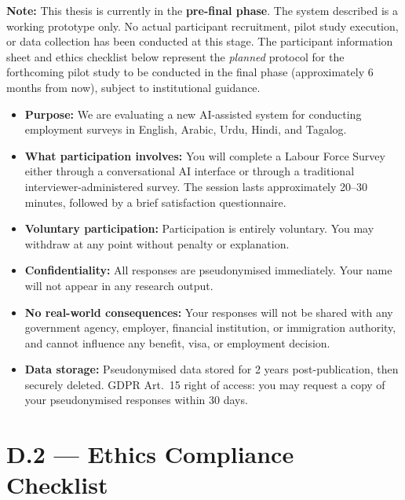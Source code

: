 \noindent\textbf{Note:}
This thesis is currently in the \textbf{pre-final phase}. The system described
is a working prototype only. No actual participant recruitment, pilot study
execution, or data collection has been conducted at this stage. The participant
information sheet and ethics checklist below represent the \textit{planned}
protocol for the forthcoming pilot study to be conducted in the final phase
(approximately 6 months from now), subject to institutional guidance.

\begin{itemize}
  \item \textbf{Purpose:} We are evaluating a new AI-assisted system for
  conducting employment surveys in English, Arabic, Urdu, Hindi, and Tagalog.

  \item \textbf{What participation involves:} You will complete a Labour
  Force Survey either through a conversational AI interface or through a
  traditional interviewer-administered survey.
  The session lasts approximately 20--30 minutes, followed by a brief
  satisfaction questionnaire.

  \item \textbf{Voluntary participation:} Participation is entirely voluntary.
  You may withdraw at any point without penalty or explanation.

  \item \textbf{Confidentiality:} All responses are pseudonymised immediately.
  Your name will not appear in any research output.

  \item \textbf{No real-world consequences:} Your responses will not be shared
  with any government agency, employer, financial institution, or immigration
  authority, and cannot influence any benefit, visa, or employment decision.

  \item \textbf{Data storage:} Pseudonymised data stored for 2 years
  post-publication, then securely deleted.
  GDPR Art.~15 right of access: you may request a copy of your
  pseudonymised responses within 30 days.
\end{itemize}

\section*{D.2 --- Ethics Compliance Checklist}

